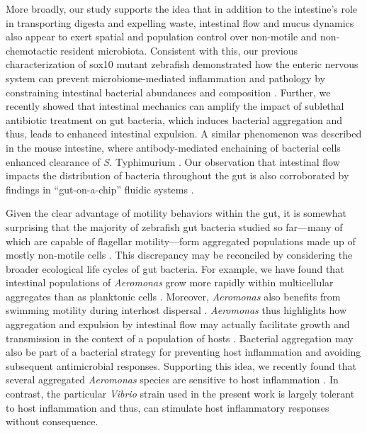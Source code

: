 {{{{{{{More broadly, our study supports the idea that in addition to the intestine's role in transporting digesta and expelling waste, intestinal flow and mucus dynamics also appear to exert spatial and population control over non-motile and non-chemotactic resident microbiota. Consistent with this, our previous characterization of sox10 mutant zebrafish demonstrated how the enteric nervous system can prevent microbiome-mediated inflammation and pathology by constraining intestinal bacterial abundances and composition \cite{rolig_enteric_2017}. Further, we recently showed that intestinal mechanics can amplify the impact of sublethal antibiotic treatment on gut bacteria, which induces bacterial aggregation and thus, leads to enhanced intestinal expulsion\cite{schlomann_sublethal_2019}. A similar phenomenon was described in the mouse intestine, where antibody-mediated enchaining of bacterial cells enhanced clearance of \textit{S. }Typhimurium \cite{moor_high-avidity_2017}. Our observation that intestinal flow impacts the distribution of bacteria throughout the gut is also corroborated by findings in ``gut-on-a-chip'' fluidic systems \cite{cremer_effect_2016}. 

Given the clear advantage of motility behaviors within the gut, it is somewhat surprising that the majority of zebrafish gut bacteria studied so far—many of which are capable of flagellar motility—form aggregated populations made up of mostly non-motile cells \cite{wiles_modernized_2018}. This discrepancy may be reconciled by considering the broader ecological life cycles of gut bacteria. For example, we have found that intestinal populations of \textit{Aeromonas} grow more rapidly within multicellular aggregates than as planktonic cells \cite{jemielita_spatial_2014}. Moreover, \textit{Aeromonas} also benefits from swimming motility during interhost dispersal \cite{robinson_experimental_2018}. \textit{Aeromonas} thus highlights how aggregation and expulsion by intestinal flow may actually facilitate growth and transmission in the context of a population of hosts \cite{robinson_scales_2019}. Bacterial aggregation may also be part of a bacterial strategy for preventing host inflammation and avoiding subsequent antimicrobial responses. Supporting this idea, we recently found that several aggregated \textit{Aeromonas} species are sensitive to host inflammation \cite{rolig_bacterial_2018}. In contrast, the particular \textit{Vibrio} strain used in the present work is largely tolerant to host inflammation \cite{rolig_individual_2015} and thus, can stimulate host inflammatory responses without consequence.

}}}}}}}
